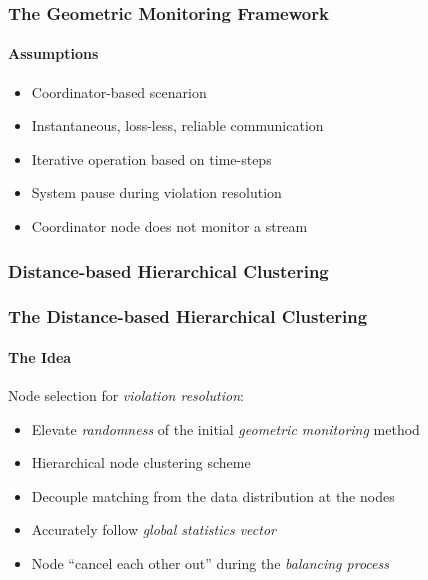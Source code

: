 \documentclass[hyperref={pdfpagelabels=false}]{beamer}
\begin{document}
\begin{frame} \frametitle{The Geometric Monitoring Framework} \framesubtitle{Assumptions}
\noindent\begin{minipage}[t]{0.45\linewidth}
\begin{itemize}\vspace{-2.5cm}
\item Coordinator-based scenarion
\item Instantaneous, loss-less, reliable communication
\item Iterative operation based on time-steps
\item System pause during violation resolution
\item Coordinator node does not monitor a stream
\end{itemize}
\end{minipage}\hfill\noindent{}
\end{frame}

\subsubsection*{Distance-based Hierarchical Clustering}
\begin{frame} \frametitle{The Distance-based Hierarchical Clustering}\framesubtitle{The Idea}
Node selection for \emph{violation resolution}:
\begin{itemize}
\item Elevate \emph{randomness} of the initial \emph{geometric monitoring} method
\item Hierarchical node clustering scheme
\item Decouple matching from the data distribution at the nodes
\item Accurately follow \emph{global statistics vector}
\item Node ``cancel each other out'' during the \emph{balancing process}
\end{itemize}
\end{frame}
\end{document}
